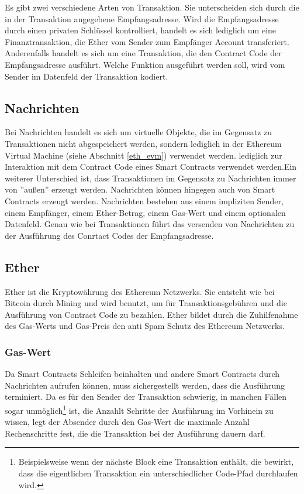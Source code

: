 Es gibt zwei verschiedene Arten von Transaktion. Sie unterscheiden sich durch die in der Transaktion angegebene Empfangsadresse. 
Wird die Empfangsadresse durch einen privaten Schlüssel kontrolliert, handelt es sich lediglich um eine Finanztransaktion, die Ether vom Sender zum Empfänger Account transferiert. Anderenfalls handelt es sich um eine Transaktion, die den Contract Code der Empfangsadresse ausführt. Welche Funktion ausgeführt werden soll, wird vom Sender im Datenfeld der Transaktion kodiert.

\subsection{Nachrichten}\label{eth_messages}
Bei Nachrichten handelt es sich um virtuelle Objekte, die im Gegensatz zu Transaktionen nicht abgespeichert werden, sondern lediglich in der Ethereum Virtual Machine (siehe Abschnitt \ref{eth_evm}) verwendet werden. \if lediglich zur Interaktion mit dem Contract Code eines Smart Contracts verwendet werden.\fi Ein weiterer Unterschied ist, dass Transaktionen im Gegensatz zu Nachrichten immer von ''außen'' erzeugt werden. Nachrichten können hingegen auch von Smart Contracts erzeugt werden. Nachrichten bestehen aus einem impliziten Sender, einem Empfänger, einem Ether-Betrag, einem Gas-Wert und einem optionalen Datenfeld. Genau wie bei Transaktionen führt das versenden von Nachrichten zu der Ausführung des Conrtact Codes der Empfangsadresse.

\subsection{Ether}\label{eth_ether} 
Ether ist die Kryptowährung des Ethereum Netzwerks. Sie entsteht wie bei Bitcoin durch Mining und wird benutzt, um für Transaktionsgebühren und die Ausführung von Contract Code zu bezahlen. Ether bildet durch die Zuhilfenahme des Gas-Werts und Gas-Preis den anti Spam Schutz des Ethereum Netzwerks.
\subsubsection{Gas-Wert}
Da Smart Contracts Schleifen beinhalten und andere Smart Contracts durch Nachrichten aufrufen können, muss sichergestellt werden, dass die Ausführung terminiert. Da es für den Sender der Transaktion schwierig, in manchen Fällen sogar unmöglich\footnote{Beispielsweise wenn der nächste Block eine Transaktion enthält, die bewirkt, dass die eigentlichen Transaktion ein unterschiedlicher Code-Pfad durchlaufen wird.} ist, die Anzahlt Schritte der Ausführung im Vorhinein zu wissen, legt der Absender durch den Gas-Wert die maximale Anzahl Rechenschritte fest, die die Transaktion bei der Ausführung dauern darf.
